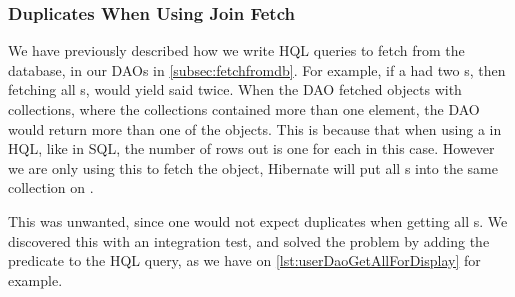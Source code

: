\subsubsection*{Duplicates When Using Join Fetch}
We have previously described how we write \ac{HQL} queries to fetch from the database, in our \acp{DAO} in \cref{subsec:fetchfromdb}.
For example, if a  had two s, then fetching all s, would yield said  twice.
When the \ac{DAO} fetched objects with collections, where the collections contained more than one element, the \ac{DAO} would return more than one of the objects.
This is because that when using a  in \ac{HQL}, like in \ac{SQL}, the number of rows out is one for each  in this case.
However we are only using this to fetch the object, Hibernate will put all s into the same collection on .

This was unwanted, since one would not expect duplicates when getting all s.
We discovered this with an integration test, and solved the problem by adding the predicate  to the \ac{HQL} query, as we have on \cref{lst:userDaoGetAllForDisplay} for example.



